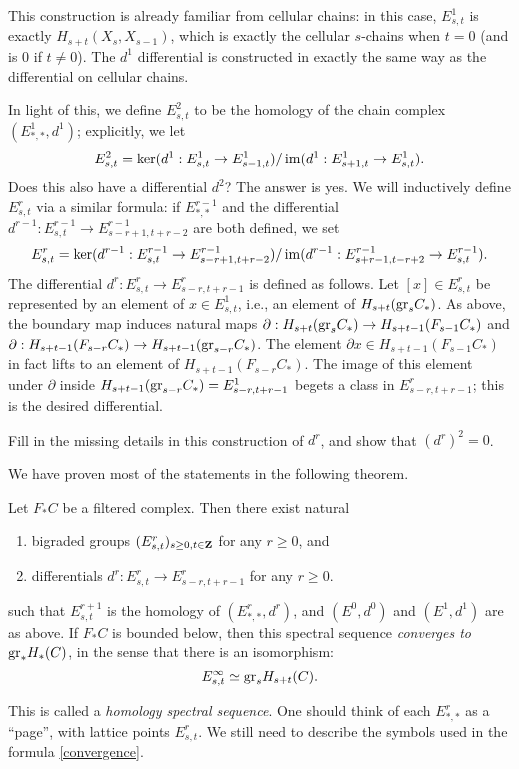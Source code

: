 This construction is already familiar from cellular chains: in this case,
$E^1_{s,t}$ is exactly $H_{s+t}(X_{s},X_{s-1})$, which is exactly the cellular
$s$-chains when $t=0$ (and is $0$ if $t\neq 0$). The $d^1$ differential is
constructed in exactly the same way as the differential on cellular chains.

In light of this, we define $E^2_{s,t}$ to be the homology of the chain complex
$(E^1_{\ast,\ast}, d^1)$; explicitly, we let
$$E^2_{s,t} = \ker(d^1:E^1_{s,t}\to E^1_{s-1,t})/\operatorname{im}(d^1:E^1_{s+1,t}\to
E^1_{s,t}).$$
Does this also have a differential $d^2$? The answer is yes. We will
inductively define $E^r_{s,t}$ via a similar formula: if $E^{r-1}_{\ast,\ast}$
and the differential $d^{r-1}:E^{r-1}_{s,t}\to E^{r-1}_{s-r+1,t+r-2}$ are both
defined, we set
$$E^{r}_{s,t} = \ker(d^{r-1}:E^{r-1}_{s,t}\to
E^{r-1}_{s-r+1,t+r-2})/\operatorname{im}(d^{r-1}:E^{r-1}_{s+r-1,t-r+2}\to E^{r-1}_{s,t}).$$
The differential $d^{r}:E^{r}_{s,t}\to E^{r}_{s-r,t+r-1}$ is defined as
follows. Let $[x]\in E^r_{s,t}$ be represented by an element of $x\in
E^1_{s,t}$, i.e., an element of $H_{s+t}(\mathrm{gr}_s C_\ast)$. As above, the boundary
map induces natural maps $\partial:H_{s+t}(\mathrm{gr}_s C_\ast)\to H_{s+t-1}(F_{s-1}
C_\ast)$ and $\partial:H_{s+t-1}(F_{s-r} C_\ast)\to H_{s+t-1}(\mathrm{gr}_{s-r}
C_\ast)$. The element $\partial x\in H_{s+t-1}(F_{s-1} C_\ast)$ in fact lifts
to an element of $H_{s+t-1}(F_{s-r} C_\ast)$. The image of this element under
$\partial$ inside $H_{s+t-1}(\mathrm{gr}_{s-r} C_\ast) = E^1_{s-r,t+r-1}$ begets a
class in $E^r_{s-r,t+r-1}$; this is the desired differential.
\begin{exercise}
    Fill in the missing details in this construction of $d^r$, and show that
    $(d^r)^2 = 0$.
\end{exercise}
We have proven most of the statements in the following theorem.
\begin{thm-defn}\label{filtered-sseq}
    Let $F_\ast C$ be a filtered complex. Then there exist natural
    \begin{enumerate}
	\item bigraded groups $(E^r_{s,t})_{s\geq 0, t\in\mathbf Z}$ for any $r\geq
	    0$, and
	\item differentials $d^r:E^r_{s,t} \to E^r_{s-r,t+r - 1}$ for any
	    $r\geq 0$.
    \end{enumerate}
    such that $E^{r+1}_{s,t}$ is the homology of $(E^r_{\ast,\ast},d^r)$, and
    $(E^0, d^0)$ and $(E^1, d^1)$ are as above. If $F_\ast C$ is bounded
    below, then this spectral sequence \emph{converges to $\mathrm{gr}_\ast
    H_\ast(C)$}, in the sense that there is an isomorphism:
    \begin{equation}\label{convergence}
	E^\infty_{s,t} \simeq \mathrm{gr}_s H_{s+t}(C).
    \end{equation}
\end{thm-defn}
This is called a \emph{homology spectral sequence}. One should think of each
$E^r_{\ast,\ast}$ as a ``page'', with lattice points $E^r_{s,t}$. We still need
to describe the symbols used in the formula \eqref{convergence}.

